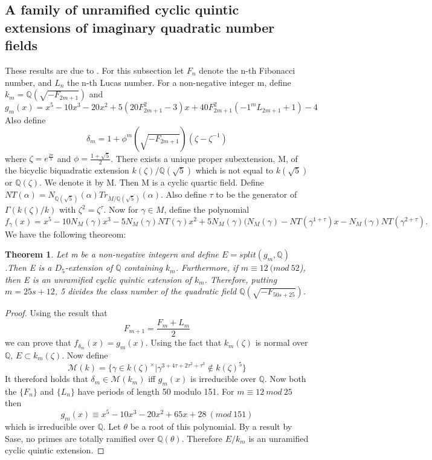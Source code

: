 \documentclass[preprint,12pt,reqno]{elsarticle}
\newtheorem{theorem}{Theorem}
\newcommand{\q}{\mathbb{Q}}
\begin{document}
\subsection{A family of unramified cyclic quintic extensions of imaginary quadratic number fields}
These results are due to \cite{KISH}. For this subsection let $F_n$ denote the n-th Fibonacci number, and $L_n$ the n-th Lucas number. For a non-negative integer m, define $k_m = \q(\sqrt{-F_{2m+1}})$ and \begin{equation}
    g_m(x) = x^5 - 10x^3  -20x^2 + 
    5(20F^2_{2m+1} - 3)x
    + 40F^2_{2m+1}(-1^{m}L_{2m+1} + 1)- 4
\end{equation} 
Also define \begin{equation}
    \delta_m = 1+\phi^m(\sqrt{-F_{2m+1}})(\zeta-\zeta^{-1})
\end{equation} where $\zeta = e^{\frac{2\pi}{5}}$ and $\phi = \frac{1+\sqrt{5}}{2}$. There exists a unique proper subextension, M, of the bicyclic biquadratic
extension $k(\zeta)/\q(\sqrt{5})$ which is not equal to $k(\sqrt{5})$ or $\q(\zeta)$. We denote it by M. Then M is a cyclic quartic field. Define $NT(\alpha) = N_{\q(\sqrt{5})}(\alpha)Tr_{M/\q(\sqrt{5})}(\alpha)$. Also define $\tau$ to be the generator of $\Gamma(k(\zeta)/k)$ with $\zeta^2=\zeta^\tau$.
Now for $\gamma \in M$, define the polynomial \begin{equation}
    f_\gamma(x) = x^5 - 10N_M(\gamma)x^3 - 5N_M(\gamma)NT (\gamma)x^2
+ 5N_M(\gamma)(N_M(\gamma) - NT(\gamma^{1+\tau})x - N_M(\gamma)NT(\gamma^{2+\tau}) 
.
\end{equation}
We have the following theoreom: \begin{theorem}
    Let m be a non-negative integern and define $E = split(g_m,\q)$.Then E is a $D_5$-extension
of $\q$ containing $k_m$. Furthermore, if $m \equiv 12 \:(mod\:52$), then E is an unramified cyclic quintic extension of $k_m$. Therefore, putting $m = 25s + 12$, 5 divides the class number of the quadratic field $\q(\sqrt{-F_{50s+25}})$.
\end{theorem}
\begin{proof}
Using the result that \begin{equation}
    F_{m+1}= \frac{F_m + L_m}{2}
\end{equation}
we can prove that $f_{\delta_m}(x) = g_m(x)$. Using the fact that $k_m(\zeta)$ is normal over $\q$, $E\subset k_m(\zeta)$. Now define  \begin{equation}
    \mathcal{M}(k)=\{\gamma \in k(\zeta)^{\times}|\gamma^{3+4\tau+2\tau^{2}+\tau^3}\notin k(\zeta)^5\}
\end{equation}
It thereford holds that $\delta_m \in \mathcal{M}(k_m)$ iff $g_m(x)$ is irreducible over $\q$. Now both the $\{F_n\}$ and $\{L_n\}$ have periods of length 50 modulo 151. For $m\equiv12 \: mod \: 25$ then \begin{equation}
    g_m(x) \equiv x^5 - 10x^3 - 20x^2 + 65x + 28\:(mod \:151)
\end{equation} which is irreducible over $\q$. Let $\theta$ be a root of this polynomial. By a result by Sase, no primes are totally ramified over $\q(\theta)$. Therefore $E/k_m$ is an unramified cyclic quintic extension. 
\end{proof}
\end{document}
